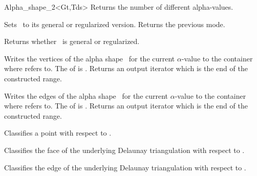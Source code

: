 \begin{ccClassTemplate} {Alpha_shape_2<Gt,Tds>}
{Returns the number of different alpha-values.}

% 
% 
% 

{Sets \ccVar\ to its general or regularized version. 
Returns the previous mode.}

{Returns whether \ccVar\ is general or regularized.}

{Writes the vertices of the alpha shape \ccVar\ for the current $\alpha$-value
to the container where  refers to. 
The  of  is .
Returns an output iterator which is the end of the constructed range.}

{Writes the edges 
of the alpha shape \ccVar\ for the current $\alpha$-value
to the container where  refers to. 
The  of  is .
Returns an output iterator which is the end of the constructed range.}



{Classifies a point  with respect to \ccVar.}

{Classifies the face  of the underlying Delaunay triangulation with respect to \ccVar.}

{Classifies the edge  of the underlying Delaunay triangulation with respect to \ccVar.}


\end{ccClassTemplate}
